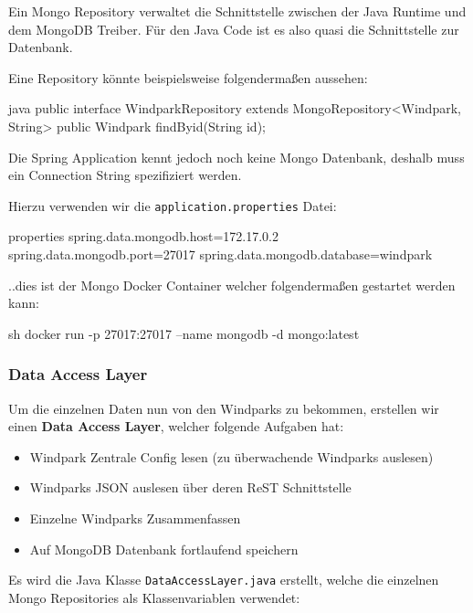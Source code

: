 Ein Mongo Repository verwaltet die Schnittstelle zwischen der Java Runtime und dem MongoDB Treiber. Für den Java Code ist es also quasi die Schnittstelle zur Datenbank.

Eine Repository könnte beispielsweise folgendermaßen aussehen:

\begin{code}{java}
    public interface WindparkRepository extends MongoRepository<Windpark, String> {
        public Windpark findByid(String id);
    }
\end{code}

Die Spring Application kennt jedoch noch keine Mongo Datenbank, deshalb muss ein Connection String spezifiziert werden.

Hierzu verwenden wir die \texttt{application.properties} Datei:

\begin{code}{properties}
    spring.data.mongodb.host=172.17.0.2
    spring.data.mongodb.port=27017
    spring.data.mongodb.database=windpark
\end{code}

..dies ist der Mongo Docker Container welcher folgendermaßen gestartet werden kann:

\begin{code}{sh}
    docker run -p 27017:27017 --name mongodb -d mongo:latest
\end{code}



\clearpage
\subsubsection{Data Access Layer}

Um die einzelnen Daten nun von den Windparks zu bekommen, erstellen wir einen \textbf{Data Access Layer}, welcher folgende Aufgaben hat:

\begin{itemize}
    \item Windpark Zentrale Config lesen (zu überwachende Windparks auslesen)
    \item Windparks JSON auslesen über deren ReST Schnittstelle
    \item Einzelne Windparks Zusammenfassen
    \item Auf MongoDB Datenbank fortlaufend speichern
\end{itemize}

Es wird die Java Klasse \texttt{DataAccessLayer.java} erstellt, welche die einzelnen Mongo Repositories als Klassenvariablen verwendet:

